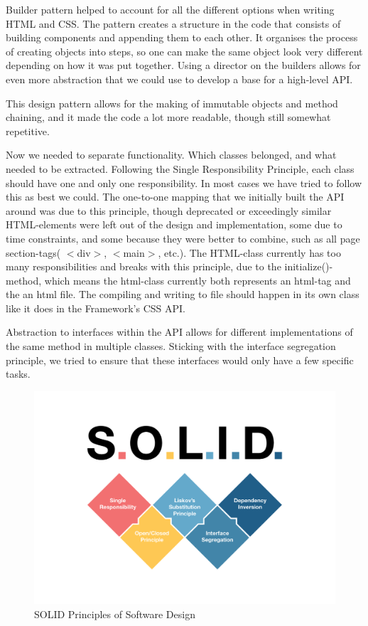 \documentclass[12pt]{article}
\begin{document}
    Builder pattern helped to account for all the different options when writing HTML and CSS. The pattern creates a structure in the code that consists of building components and appending them to each other. It organises the process of creating objects into steps, so one can make the same object look very different depending on how it was put together. Using a director on the builders allows for even more abstraction that we could use to develop a base for a high-level API.

    This design pattern allows for the making of immutable objects and method chaining, and it made the code a lot more readable, though still somewhat repetitive.
    
    Now we needed to separate functionality. Which classes belonged, and what needed to be extracted. Following the Single Responsibility Principle, each class should have one and only one responsibility. In most cases we have tried to follow this as best we could. The one-to-one mapping that we initially built the API around was due to this principle, though deprecated or exceedingly similar HTML-elements were left out of the design and implementation, some due to time constraints, and some because they were better to combine, such as all page section-tags( $<$div$>$, $<$main$>$, etc.). The HTML-class currently has too many responsibilities and breaks with this principle, due to the initialize()-method, which means the html-class currently both represents an html-tag and the an html file. The compiling and writing to file should happen in its own class like it does in the Framework’s CSS API.

    Abstraction to interfaces within the API allows for different implementations of the same method in multiple classes. Sticking with the interface segregation principle, we tried to ensure that these interfaces would only have a few specific tasks. 

    \begin{figure}[H]
        \centering
        \includegraphics[scale=0.35]{images/solidGraphic.png}
        \caption{SOLID Principles of Software Design}
    \end{figure}
\end{document}
